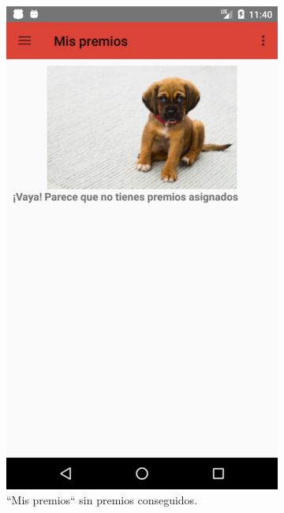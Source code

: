 \documentclass[twoside]{report}
\begin{document}
\begin{figure}[H]
\begin{center}
	\begin{subfigure}[t]{.3\linewidth}
		\includegraphics[scale=0.2]{images/userguide/9.png}
		\caption{“Mis premios“ sin premios conseguidos.}
	\end{subfigure}\hspace{5mm}%
	\begin{subfigure}[t]{.3\linewidth}

\end{subfigure}
\end{center}
\end{figure}
\end{document}
